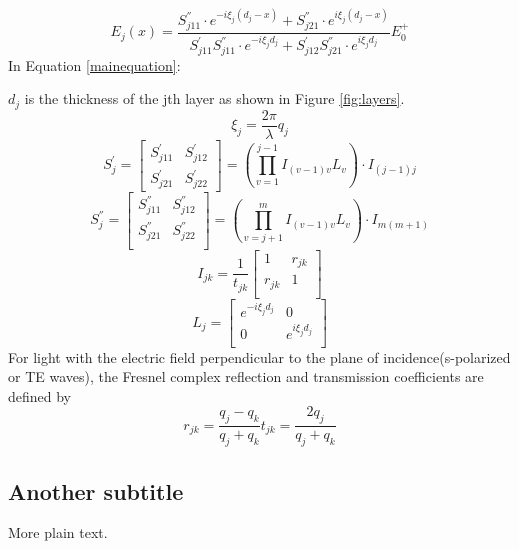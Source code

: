 \documentclass{article}
\begin{document}
\begin{equation}
{{E}_{j}}(x)=\frac{S_{j11}^{''}\cdot {{e}^{-i{{\xi
}_{j}}({{d}_{j}}-x)}}+S_{j21}^{''}\cdot {{e}^{i{{\xi }_{j}}({{d}_{j}}-x)}}}{S_{j11}^{'}S_{j11}^{''}\cdot {{e}^{-i{{\xi }_{j}}{{d}_{j}}}}+S_{j12}^{'}S_{j21}^{''}\cdot {{e}^{i{{\xi }_{j}}{{d}_{j}}}}}E_{0}^{+}
\label{mainequation} 
\end{equation}
In Equation \ref{mainequation}:

$d_j$ is the thickness of the jth layer as shown in Figure \ref{fig:layers}.
\begin{equation}
{{\xi }_{j}}=\frac{2\pi }{\lambda }{{q}_{j}}
\end{equation}
\begin{equation}
S_{j}^{'}=\left[ \begin{matrix}
   S_{j11}^{'} & S_{j12}^{'}\\
   S_{j21}^{'} & S_{j22}^{'}  
\end{matrix} \right]=\left( \prod\limits_{v=1}^{j-1}{{{I}_{(v-1)v}}{{L}_{v}}} \right)\cdot {{I}_{(j-1)j}}
\label{Sp} 
\end{equation}
\begin{equation}
S_{j}^{''}=\left[ \begin{matrix}
   S_{j11}^{''} & S_{j12}^{''}\\
   S_{j21}^{''} & S_{j22}^{''}\\
\end{matrix} \right]=\left( \prod\limits_{v=j+1}^{m}{{{I}_{(v-1)v}}{{L}_{v}}} \right)\cdot {{I}_{m(m+1)}}
\label{Spp} 
\end{equation}
\begin{equation}
{{I}_{jk}}=\frac{1}{{{t}_{jk}}}\left[ \begin{matrix}
   1 & {{r}_{jk}}  \\
   {{r}_{jk}} & 1  \\
\end{matrix} \right]
\end{equation}
\begin{equation}
{{L}_{j}}=\left[ \begin{matrix}
   {{e}^{-i{{\xi }_{j}}{{d}_{j}}}} & 0  \\
   0 & {{e}^{i{{\xi }_{j}}{{d}_{j}}}}  \\
\end{matrix} \right]
\end{equation}
For light with the electric field perpendicular to the plane of
incidence(s-polarized or TE waves), the Fresnel complex reflection and
transmission coefficients are defined by
\begin{subequations}
\begin{equation}
{{r}_{jk}}=\frac{{{q}_{j}}-{{q}_{k}}}{{{q}_{j}}+{{q}_{k}}}
\end{equation}
\begin{equation}
{{t}_{jk}}=\frac{2{{q}_{j}}}{{{q}_{j}}+{{q}_{k}}}
\end{equation}
\end{subequations}



\subsection{Another subtitle}
More plain text.

{}

\end{document}
